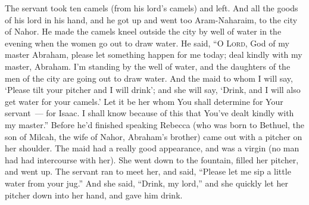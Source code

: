 \begin{inparaenum}
   The servant took ten camels (from his lord's camels) and left. And all the goods of his lord in his hand, and he got up and went too Aram-Naharaim, to the city of Nahor.%
   He made the camels kneel outside the city by well of water in the evening when the women go out to draw water.%
   He said, ``O \textsc{Lord}, God of my master Abraham, please let something happen for me today; deal kindly with my master, Abraham.%
   I'm standing by the well of water, and the daughters of the men of the city are going out to draw water.%
   And the maid to whom I will say, `Please tilt your pitcher and I will drink'; and she will say, `Drink, and I will also get water for your camels.' Let it be her whom You shall determine for Your servant~--- for Isaac. I shall know because of this that You've dealt kindly with my master.''%
   Before he'd finished speaking Rebecca (who was born to Bethuel, the son of Milcah, the wife of Nahor, Abraham's brother) came out with a pitcher on her shoulder.%
   The maid had a really good appearance, and was a virgin (no man had had intercourse with her). She went down to the fountain, filled her pitcher, and went up.%
   The servant ran to meet her, and said, ``Please let me sip a little water from your jug.''%
   And she said, ``Drink, my lord,'' and she quickly let her pitcher down into her hand, and gave him drink.%

\end{inparaenum}
